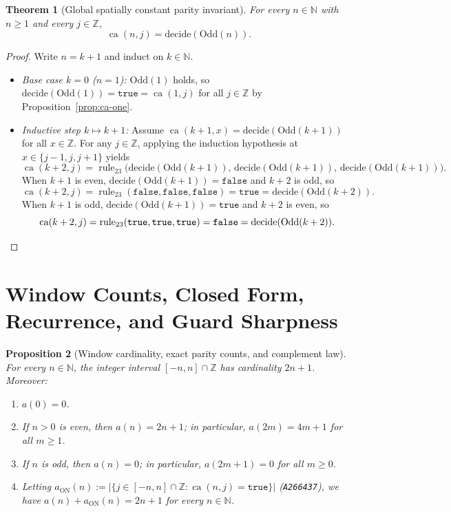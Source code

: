 \documentclass[11pt]{article}
\newtheorem{theorem}{Theorem}[section]
\newtheorem{proposition}[theorem]{Proposition}
\theoremstyle{definition}
\newcommand{\N}{\mathbb{N}}
\newcommand{\Z}{\mathbb{Z}}
\newcommand{\seq}[1]{\texttt{#1}}
\newcommand{\ruleTT}{\operatorname{rule}_{23}}
\newcommand{\ca}{\operatorname{ca}}
\begin{document}
\begin{theorem}[Global spatially constant parity invariant]
\label{thm:ca-parity}
For every $n \in \N$ with $n \ge 1$ and every $j \in \Z$,
\[
\ca(n, j) = \mathrm{decide}(\mathrm{Odd}(n)).
\]
\end{theorem}

\begin{proof}
Write $n = k + 1$ and induct on $k \in \N$.
\begin{itemize}
\item \emph{Base case $k = 0$ ($n = 1$):} $\mathrm{Odd}(1)$ holds, so $\mathrm{decide}(\mathrm{Odd}(1)) = \mathtt{true} = \ca(1, j)$ for all $j \in \Z$ by Proposition~\ref{prop:ca-one}.
\item \emph{Inductive step $k \mapsto k + 1$:} Assume $\ca(k + 1, x) = \mathrm{decide}(\mathrm{Odd}(k + 1))$ for all $x \in \Z$. For any $j \in \Z$, applying the induction hypothesis at $x \in \{j - 1, j, j + 1\}$ yields
\[
\ca(k + 2, j) = \ruleTT\bigl(\mathrm{decide}(\mathrm{Odd}(k + 1)),\, \mathrm{decide}(\mathrm{Odd}(k + 1)),\, \mathrm{decide}(\mathrm{Odd}(k + 1))\bigr).
\]
When $k + 1$ is even, $\mathrm{decide}(\mathrm{Odd}(k + 1)) = \mathtt{false}$ and $k + 2$ is odd, so
\[
\ca(k + 2, j) = \ruleTT(\mathtt{false}, \mathtt{false}, \mathtt{false}) = \mathtt{true} = \mathrm{decide}(\mathrm{Odd}(k + 2)).
\]
When $k + 1$ is odd, $\mathrm{decide}(\mathrm{Odd}(k + 1)) = \mathtt{true}$ and $k + 2$ is even, so
\[
\ca(k + 2, j) = \ruleTT(\mathtt{true}, \mathtt{true}, \mathtt{true}) = \mathtt{false} = \mathrm{decide}(\mathrm{Odd}(k + 2)). \qedhere
\]
\end{itemize}
\end{proof}

\section{Window Counts, Closed Form, Recurrence, and Guard Sharpness}

\begin{proposition}[Window cardinality, exact parity counts, and complement law]
\label{prop:counts}
For every $n \in \N$, the integer interval $[-n, n] \cap \Z$ has cardinality $2n + 1$. Moreover:
\begin{enumerate}
\item[\textup{(a)}] $a(0) = 0$.
\item[\textup{(b)}] If $n > 0$ is even, then $a(n) = 2n + 1$; in particular, $a(2m) = 4m + 1$ for all $m \ge 1$.
\item[\textup{(c)}] If $n$ is odd, then $a(n) = 0$; in particular, $a(2m + 1) = 0$ for all $m \ge 0$.
\item[\textup{(d)}] Letting $a_{\mathrm{ON}}(n) := |\{j \in [-n, n] \cap \Z : \ca(n, j) = \mathtt{true}\}|$ (\seq{A266437}), we have $a(n) + a_{\mathrm{ON}}(n) = 2n + 1$ for every $n \in \N$.
\end{enumerate}
\end{proposition}
\end{document}
